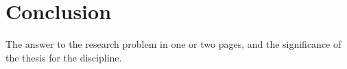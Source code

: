 \chapter{Conclusion}\label{ch:conclusion}

The answer to the research problem in one or two pages, and the significance
of the thesis for the discipline.
